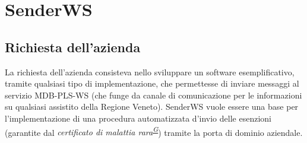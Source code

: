 \documentclass[a4paper]{article}
\begin{document}
\newpage

\section{SenderWS}

\subsection{Richiesta dell'azienda}
La richiesta dell'azienda consisteva nello sviluppare un software esemplificativo, tramite qualsiasi tipo di implementazione, che permettesse di inviare messaggi al servizio MDB-PLS-WS (che funge da canale di comunicazione per le informazioni su qualsiasi assistito della Regione Veneto). SenderWS vuole essere una base per l'implementazione di una procedura automatizzata d'invio delle esenzioni (garantite dal \textit{certificato di malattia rara\textsuperscript{\hyperref[sec:gl]{G}}}) tramite la porta di dominio aziendale. 
\end{document}
